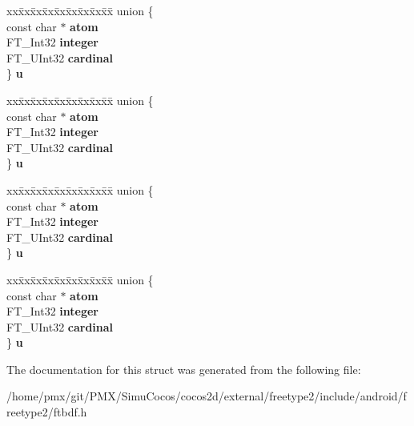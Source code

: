 \begin{DoxyCompactItemize}
\begin{tabbing}
\end{tabbing}\item 
\mbox{\label{structBDF__PropertyRec___ac5a8fea827e43fc706b0a18f784cc99b}} 
\begin{tabbing}
xx\=xx\=xx\=xx\=xx\=xx\=xx\=xx\=xx\=\kill
union \{\\
\>const char $\ast$ {\bfseries atom}\\
\>FT\_Int32 {\bfseries integer}\\
\>FT\_UInt32 {\bfseries cardinal}\\
\} {\bfseries u}\\

\end{tabbing}\item 
\mbox{\label{structBDF__PropertyRec___a36ba659c08b913e1f889616acaa6f8de}} 
\begin{tabbing}
xx\=xx\=xx\=xx\=xx\=xx\=xx\=xx\=xx\=\kill
union \{\\
\>const char $\ast$ {\bfseries atom}\\
\>FT\_Int32 {\bfseries integer}\\
\>FT\_UInt32 {\bfseries cardinal}\\
\} {\bfseries u}\\

\end{tabbing}\item 
\mbox{\label{structBDF__PropertyRec___a3f319d845381e18ed9f88e34a1103ce6}} 
\begin{tabbing}
xx\=xx\=xx\=xx\=xx\=xx\=xx\=xx\=xx\=\kill
union \{\\
\>const char $\ast$ {\bfseries atom}\\
\>FT\_Int32 {\bfseries integer}\\
\>FT\_UInt32 {\bfseries cardinal}\\
\} {\bfseries u}\\

\end{tabbing}\item 
\mbox{\label{structBDF__PropertyRec___ac7b098c517a147f86c466c6fbb9cb406}} 
\begin{tabbing}
xx\=xx\=xx\=xx\=xx\=xx\=xx\=xx\=xx\=\kill
union \{\\
\>const char $\ast$ {\bfseries atom}\\
\>FT\_Int32 {\bfseries integer}\\
\>FT\_UInt32 {\bfseries cardinal}\\
\} {\bfseries u}\\

\end{tabbing}\end{DoxyCompactItemize}


The documentation for this struct was generated from the following file\+:\begin{DoxyCompactItemize}
\item 
/home/pmx/git/\+P\+M\+X/\+Simu\+Cocos/cocos2d/external/freetype2/include/android/freetype2/ftbdf.\+h\end{DoxyCompactItemize}
